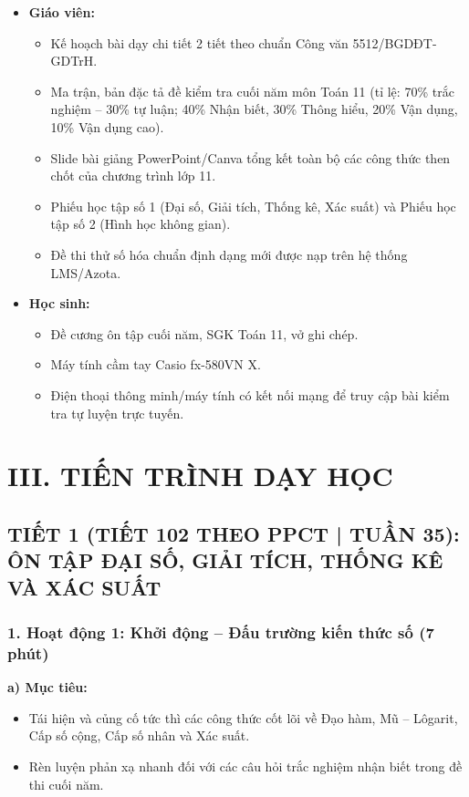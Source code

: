 \documentclass[12pt, a4paper]{article}
\begin{document}
\begin{itemize}[leftmargin=1.2cm]
    \item \textbf{Giáo viên:}
    \begin{itemize}[leftmargin=0.6cm]
        \item Kế hoạch bài dạy chi tiết 2 tiết theo chuẩn Công văn 5512/BGDĐT-GDTrH.
        \item Ma trận, bản đặc tả đề kiểm tra cuối năm môn Toán 11 (tỉ lệ: 70\% trắc nghiệm -- 30\% tự luận; 40\% Nhận biết, 30\% Thông hiểu, 20\% Vận dụng, 10\% Vận dụng cao).
        \item Slide bài giảng PowerPoint/Canva tổng kết toàn bộ các công thức then chốt của chương trình lớp 11.
        \item Phiếu học tập số 1 (Đại số, Giải tích, Thống kê, Xác suất) và Phiếu học tập số 2 (Hình học không gian).
        \item Đề thi thử số hóa chuẩn định dạng mới được nạp trên hệ thống LMS/Azota.
    \end{itemize}
    \item \textbf{Học sinh:}
    \begin{itemize}[leftmargin=0.6cm]
        \item Đề cương ôn tập cuối năm, SGK Toán 11, vở ghi chép.
        \item Máy tính cầm tay Casio fx-580VN X.
        \item Điện thoại thông minh/máy tính có kết nối mạng để truy cập bài kiểm tra tự luyện trực tuyến.
    \end{itemize}
\end{itemize}

\section*{III. TIẾN TRÌNH DẠY HỌC}

\subsection*{TIẾT 1 (TIẾT 102 THEO PPCT | TUẦN 35): ÔN TẬP ĐẠI SỐ, GIẢI TÍCH, THỐNG KÊ VÀ XÁC SUẤT}

\subsubsection*{1. Hoạt động 1: Khởi động -- Đấu trường kiến thức số (7 phút)}

\noindent \textbf{a) Mục tiêu:}
\begin{itemize}[leftmargin=0.6cm]
    \item Tái hiện và củng cố tức thì các công thức cốt lõi về Đạo hàm, Mũ -- Lôgarit, Cấp số cộng, Cấp số nhân và Xác suất.
    \item Rèn luyện phản xạ nhanh đối với các câu hỏi trắc nghiệm nhận biết trong đề thi cuối năm.
\end{itemize}
\end{document}

